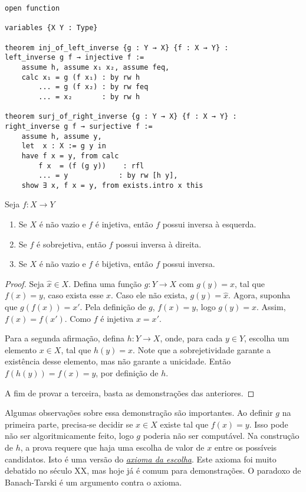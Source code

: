\begin{lstlisting}
open function 

variables {X Y : Type}

theorem inj_of_left_inverse {g : Y → X} {f : X → Y} :
left_inverse g f → injective f :=
    assume h, assume x₁ x₂, assume feq, 
    calc x₁ = g (f x₁) : by rw h
        ... = g (f x₂) : by rw feq
        ... = x₂       : by rw h

theorem surj_of_right_inverse {g : Y → X} {f : X → Y} :
right_inverse g f → surjective f :=
    assume h, assume y,
    let  x : X := g y in
    have f x = y, from calc
        f x  = (f (g y))    : rfl
        ... = y            : by rw [h y],
    show ∃ x, f x = y, from exists.intro x this
\end{lstlisting}

\begin{theorem}
    \label{prop6}
    Seja $f: X \to Y$
    \renewcommand{\labelenumi}{\Roman{enumi}}
    \begin{enumerate}
        \item Se $X$ é não vazio e $f$ é injetiva, então $f$ possui inversa à esquerda.
        \item Se $f$ é sobrejetiva, então $f$ possui inversa à direita.
        \item Se $X$ é não vazio e $f$ é bijetiva, então $f$ possui inversa.
    \end{enumerate}
\end{theorem}

\begin{proof}
    Seja $\hat{x} \in X$. Defina uma função $g: Y \to X$ com $g(y) = x$, tal que $f(x) = y$,
    caso exista esse $x$. Caso ele não exista, $g(y) = \hat{x}$. Agora, suponha que 
    $g(f(x)) = x'$. Pela definição de $g$, $f(x) = y$, logo $g(y) = x$. Assim, $f(x) = f(x')$.
    Como $f$ é injetiva $x = x'$. 

    Para a segunda afirmação, defina $h: Y \to X$, onde, para cada $y \in Y$, escolha um elemento 
    $x \in X$, tal que $h(y) = x$. Note que a sobrejetividade garante a existência desse elemento,
    mas não garante a unicidade. Então $f(h(y)) = f(x) = y$, por definição de $h$. 

    A fim de provar a terceira, basta as demonstrações das anteriores. 
\end{proof}

Algumas observações sobre essa demonstração são importantes. Ao definir $g$ na primeira parte, 
precisa-se decidir se $x \in X$ existe tal que $f(x) = y$. Isso pode não ser algoritmicamente 
feito, logo $g$ poderia não ser computável. Na construção de $h$, a prova requere que haja 
uma escolha de valor de $x$ entre os possíveis candidatos. Isto é uma versão do 
\href{https://pt.wikipedia.org/wiki/Axioma_da_escolha#Enunciado}{\textit{axioma da escolha}}. 
Este axioma foi muito debatido no século XX, mas hoje já é comum para demonstrações. O paradoxo
de Banach-Tarski é um argumento contra o axioma.

